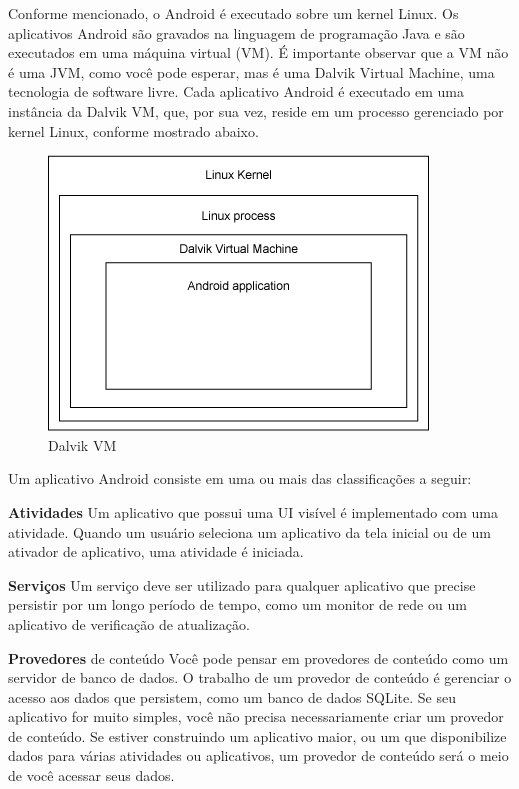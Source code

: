 \documentclass[12pt, %
openright, 
oneside, %
a4paper,    %
brazil]{facom-ufu-abntex2}
\begin{document}
Conforme mencionado, o Android é executado sobre um kernel Linux. Os aplicativos Android são gravados na linguagem de programação Java e são executados em uma máquina virtual (VM). É importante observar que a VM não é uma JVM, como você pode esperar, mas é uma Dalvik Virtual Machine, uma tecnologia de software livre. Cada aplicativo Android é executado em uma instância da Dalvik VM, que, por sua vez, reside em um processo gerenciado por kernel Linux, conforme mostrado abaixo.
\begin{figure}[!htb]
    \centering
    \includegraphics[scale=0.8,natwidth=610,natheight=64]{plataforma.png}
    \caption{Dalvik VM}
    \label{figRotulo}
  \end{figure}

Um aplicativo Android consiste em uma ou mais das classificações a seguir:

\textbf{Atividades}
Um aplicativo que possui uma UI visível é implementado com uma atividade. Quando um usuário seleciona um aplicativo da tela inicial ou de um ativador de aplicativo, uma atividade é iniciada.

\textbf{Serviços}
Um serviço deve ser utilizado para qualquer aplicativo que precise persistir por um longo período de tempo, como um monitor de rede ou um aplicativo de verificação de atualização.

\textbf{Provedores} de conteúdo
Você pode pensar em provedores de conteúdo como um servidor de banco de dados. O trabalho de um provedor de conteúdo é gerenciar o acesso aos dados que persistem, como um banco de dados SQLite. Se seu aplicativo for muito simples, você não precisa necessariamente criar um provedor de conteúdo. Se estiver construindo um aplicativo maior, ou um que disponibilize dados para várias atividades ou aplicativos, um provedor de conteúdo será o meio de você acessar seus dados.
\end{document}

